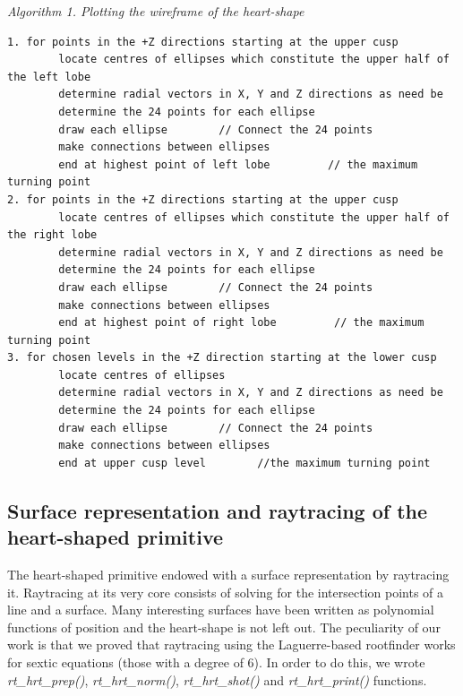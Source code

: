 \hspace{50} \textit{Algorithm 1. Plotting the wireframe of the heart­-shape }
\begin{verbatim}
1. for points in the +Z directions starting at the upper cusp 
        locate centres of ellipses which constitute the upper half of the left lobe 
        determine radial vectors in X, Y and Z directions as need be 
        determine the 24 points for each ellipse 
        draw each ellipse        // Connect the 24 points 
        make connections between ellipses 
        end at highest point of left lobe         // the maximum turning point 
2. for points in the +Z directions starting at the upper cusp 
        locate centres of ellipses which constitute the upper half of the right lobe 
        determine radial vectors in X, Y and Z directions as need be 
        determine the 24 points for each ellipse 
        draw each ellipse        // Connect the 24 points 
        make connections between ellipses 
        end at highest point of right lobe         // the maximum turning point   
3. for chosen levels in the +Z direction starting at the lower cusp 
        locate centres of ellipses 
        determine radial vectors in X, Y and Z directions as need be 
        determine the 24 points for each ellipse 
        draw each ellipse        // Connect the 24 points 
        make connections between ellipses
        end at upper cusp level        //the maximum turning point 
\end{verbatim}

\subsection{Surface   representation   and   raytracing   of   the   heart­-shaped primitive}

\hspace{30} The   heart-­shaped   primitive   endowed   with   a   surface   representation   by  
raytracing   it.   Ray­tracing   at   its   very   core   consists   of   solving   for   the   intersection  
points   of   a   line   and   a   surface.   Many   interesting   surfaces   have   been   written   as  
polynomial   functions   of   position   and   the   heart­-shape   is   not   left   out.   The  
peculiarity   of   our   work   is   that   we   proved   that   ray­tracing   using   the  
Laguerre­-based   root­finder   works   for   sextic   equations   (those   with   a   degree   of  
6).   In   order   to   do   this,   we   wrote   \textit{rt\_hrt\_prep()},   \textit{rt\_hrt\_norm()},   \textit{rt\_hrt\_shot()}   and  
\textit{rt\_hrt\_print()} functions.

